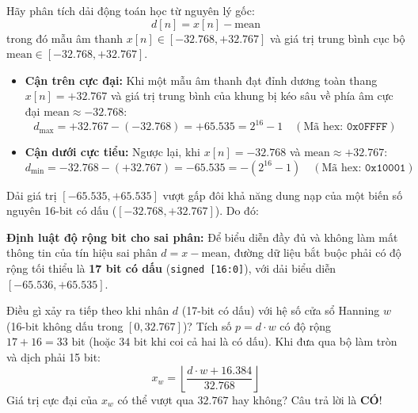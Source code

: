 Hãy phân tích dải động toán học từ nguyên lý gốc:
\begin{equation}
d[n] = x[n] - \text{mean}
\end{equation}
trong đó mẫu âm thanh $x[n] \in [-32.768, +32.767]$ và giá trị trung bình cục bộ $\text{mean} \in [-32.768, +32.767]$.
\begin{itemize}[leftmargin=1.5em, itemsep=2pt]
    \item \textbf{Cận trên cực đại:} Khi một mẫu âm thanh đạt đỉnh dương toàn thang $x[n] = +32.767$ và giá trị trung bình của khung bị kéo sâu về phía âm cực đại $\text{mean} \approx -32.768$:
    \begin{equation}
    d_{\max} = +32.767 - (-32.768) = \mathbf{+65.535} = 2^{16} - 1 \quad (\text{Mã hex: } \texttt{0x0FFFF})
    \end{equation}
    \item \textbf{Cận dưới cực tiểu:} Ngược lại, khi $x[n] = -32.768$ và $\text{mean} \approx +32.767$:
    \begin{equation}
    d_{\min} = -32.768 - (+32.767) = \mathbf{-65.535} = -(2^{16} - 1) \quad (\text{Mã hex: } \texttt{0x10001})
    \end{equation}
\end{itemize}

Dải giá trị $[-65.535, +65.535]$ vượt gấp đôi khả năng dung nạp của một biến số nguyên 16-bit có dấu ($[-32.768, +32.767]$). Do đó:
\begin{equationcard}
\textbf{Định luật độ rộng bit cho sai phân:}
Để biểu diễn đầy đủ và không làm mất thông tin của tín hiệu sai phân $d = x - \text{mean}$, đường dữ liệu bắt buộc phải có độ rộng tối thiểu là \textbf{17 bit có dấu} (\texttt{signed [16:0]}), với dải biểu diễn $[-65.536, +65.535]$.
\end{equationcard}

Điều gì xảy ra tiếp theo khi nhân $d$ (17-bit có dấu) với hệ số cửa sổ Hanning $w$ (16-bit không dấu trong $[0, 32.767]$)?
Tích số $p = d \cdot w$ có độ rộng $17 + 16 = 33\text{ bit}$ (hoặc $34\text{ bit}$ khi coi cả hai là có dấu). Khi đưa qua bộ làm tròn và dịch phải 15 bit:
\begin{equation}
x_w = \left\lfloor \frac{d \cdot w + 16.384}{32.768} \right\rfloor
\end{equation}
Giá trị cực đại của $x_w$ có thể vượt qua $32.767$ hay không? Câu trả lời là \textbf{CÓ}!

